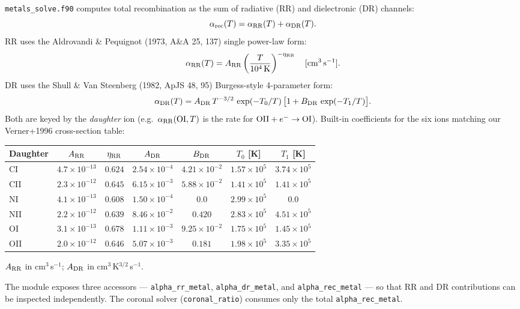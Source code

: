 \documentclass[english,a4paper]{kiseon_memo}
\begin{document}
\texttt{metals\_solve.f90} computes total recombination as the sum of
radiative (RR) and dielectronic (DR) channels:
\[
\alpha_{\rm rec}(T) = \alpha_{\rm RR}(T) + \alpha_{\rm DR}(T).
\]
RR uses the Aldrovandi \& Pequignot (1973, A\&A 25, 137) single
power-law form:
\[
\alpha_{\rm RR}(T) = A_{\rm RR} \left(\frac{T}{10^4\,\mathrm{K}}\right)^{-\eta_{\rm RR}}
\quad [\mathrm{cm^3\,s^{-1}}].
\]
DR uses the Shull \& Van Steenberg (1982, ApJS 48, 95) Burgess-style
4-parameter form:
\[
\alpha_{\rm DR}(T) = A_{\rm DR}\,T^{-3/2}\,\exp(-T_0/T)\,
   \big[1 + B_{\rm DR}\,\exp(-T_1/T)\big].
\]
Both are keyed by the \emph{daughter} ion (e.g.\
$\alpha_{\rm RR}({\rm OI}, T)$ is the rate for
${\rm OII} + e^- \to {\rm OI}$). Built-in coefficients for the six
ions matching our Verner+1996 cross-section table:

\begin{center}
\small
\begin{tabular}{|l|c|c|c|c|c|c|}
\hline
Daughter & $A_{\rm RR}$ & $\eta_{\rm RR}$ & $A_{\rm DR}$ & $B_{\rm DR}$ & $T_0$ [K] & $T_1$ [K] \\
\hline
CI   & $4.7\times 10^{-13}$ & $0.624$ & $2.54\times 10^{-4}$ & $4.21\times 10^{-2}$ & $1.57\times 10^5$ & $3.74\times 10^5$ \\
CII  & $2.3\times 10^{-12}$ & $0.645$ & $6.15\times 10^{-3}$ & $5.88\times 10^{-2}$ & $1.41\times 10^5$ & $1.41\times 10^5$ \\
NI   & $4.1\times 10^{-13}$ & $0.608$ & $1.50\times 10^{-4}$ & $0.0$                & $2.99\times 10^5$ & $0.0$             \\
NII  & $2.2\times 10^{-12}$ & $0.639$ & $8.46\times 10^{-2}$ & $0.420$              & $2.83\times 10^5$ & $4.51\times 10^5$ \\
OI   & $3.1\times 10^{-13}$ & $0.678$ & $1.11\times 10^{-3}$ & $9.25\times 10^{-2}$ & $1.75\times 10^5$ & $1.45\times 10^5$ \\
OII  & $2.0\times 10^{-12}$ & $0.646$ & $5.07\times 10^{-3}$ & $0.181$              & $1.98\times 10^5$ & $3.35\times 10^5$ \\
\hline
\end{tabular}

\smallskip
$A_{\rm RR}$ in cm$^3$\,s$^{-1}$; $A_{\rm DR}$ in cm$^3$\,K$^{3/2}$\,s$^{-1}$.
\end{center}

The module exposes three accessors --- \texttt{alpha\_rr\_metal},
\texttt{alpha\_dr\_metal}, and \texttt{alpha\_rec\_metal} --- so that
RR and DR contributions can be inspected independently. The coronal
solver (\texttt{coronal\_ratio}) consumes only the total
\texttt{alpha\_rec\_metal}.
\end{document}
